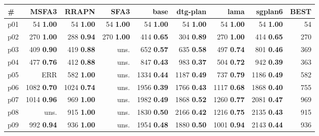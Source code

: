 \begin{tabular}{|l|rrrrrrr|r|}
\hline
\textbf{\#} & \textbf{MSFA3} & \textbf{RRAPN} & \textbf{SFA3} & \textbf{base} & \textbf{dtg-plan} & \textbf{lama} & \textbf{sgplan6} & \textbf{BEST}\\
\hline
p01 & {\footnotesize 54} \textbf{1.00} & {\footnotesize 54} \textbf{1.00} & {\footnotesize 54} \textbf{1.00} & {\footnotesize 54} \textbf{1.00} & {\footnotesize 54} \textbf{1.00} & {\footnotesize 54} \textbf{1.00} & {\footnotesize 54} \textbf{1.00} & 54\\
p02 & {\footnotesize 270} \textbf{1.00} & {\footnotesize 288} \textbf{0.94} & {\footnotesize 270} \textbf{1.00} & {\footnotesize 414} \textbf{0.65} & {\footnotesize 304} \textbf{0.89} & {\footnotesize 270} \textbf{1.00} & {\footnotesize 414} \textbf{0.65} & 270\\
p03 & {\footnotesize 409} \textbf{0.90} & {\footnotesize 419} \textbf{0.88} & uns. & {\footnotesize 652} \textbf{0.57} & {\footnotesize 635} \textbf{0.58} & {\footnotesize 497} \textbf{0.74} & {\footnotesize 801} \textbf{0.46} & 369\\
p04 & {\footnotesize 477} \textbf{0.76} & {\footnotesize 412} \textbf{0.88} & uns. & {\footnotesize 847} \textbf{0.43} & {\footnotesize 983} \textbf{0.37} & {\footnotesize 504} \textbf{0.72} & {\footnotesize 942} \textbf{0.39} & 363\\
p05 & ERR & {\footnotesize 582} \textbf{1.00} & uns. & {\footnotesize 1334} \textbf{0.44} & {\footnotesize 1187} \textbf{0.49} & {\footnotesize 737} \textbf{0.79} & {\footnotesize 1186} \textbf{0.49} & 582\\
p06 & {\footnotesize 1082} \textbf{0.70} & {\footnotesize 1024} \textbf{0.74} & uns. & {\footnotesize 1956} \textbf{0.39} & {\footnotesize 1766} \textbf{0.43} & {\footnotesize 1117} \textbf{0.68} & {\footnotesize 1868} \textbf{0.40} & 755\\
p07 & {\footnotesize 1014} \textbf{0.96} & {\footnotesize 969} \textbf{1.00} & uns. & {\footnotesize 1982} \textbf{0.49} & {\footnotesize 1868} \textbf{0.52} & {\footnotesize 1260} \textbf{0.77} & {\footnotesize 2081} \textbf{0.47} & 969\\
p08 & uns. & {\footnotesize 915} \textbf{1.00} & uns. & {\footnotesize 1830} \textbf{0.50} & {\footnotesize 2166} \textbf{0.42} & {\footnotesize 1216} \textbf{0.75} & {\footnotesize 2135} \textbf{0.43} & 915\\
p09 & {\footnotesize 992} \textbf{0.94} & {\footnotesize 936} \textbf{1.00} & uns. & {\footnotesize 1954} \textbf{0.48} & {\footnotesize 1880} \textbf{0.50} & {\footnotesize 1001} \textbf{0.94} & {\footnotesize 2143} \textbf{0.44} & 936\\

\end{tabular}
